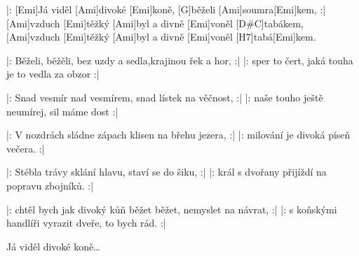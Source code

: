 
\sloka
|: [Emi]Já viděl [Ami]divoké [Emi]koně, [G]běželi [Ami]soumra[Emi]kem, :|
[Ami]vzduch [Emi]těžký [Ami]byl a divně [Emi]voněl [D#\dim C]tabákem,
[Ami]vzduch [Emi]těžký [Ami]byl a divně [Emi]voněl [H7]tabá[Emi]kem.

\sloka
|: Běželi, běžěli, bez uzdy a sedla,krajinou řek a hor, :|
|: sper to čert, jaká touha je to vedla za obzor :|

\sloka
|: Snad vesmír nad vesmírem, snad lístek na věčnost, :|
|: naše touho ještě neumírej, sil máme dost :|

\sloka
|: V nozdrách sládne zápach klisen na břehu jezera, :|
|: milování je divoká píseň večera. :|

\sloka
|: Stébla trávy sklání hlavu, staví se do šiku, :|
|: král s dvořany přijíždí na popravu zbojníků. :|

\sloka
|: chtěl bych jak divoký kůň běžet běžet, nemyslet na návrat, :|
|: s koňskými handlíři vyrazit dveře, to bych rád. :|

\napis{}
Já viděl divoké koně… 
